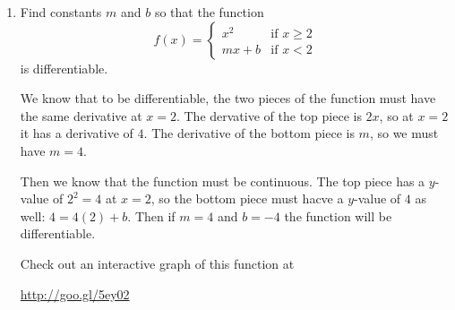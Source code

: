 \documentclass[11pt]{article}
\begin{document}
\begin{enumerate}
\begin{enumerate}
{    }
    \vfill
  \end{enumerate}

\newpage

\item Find constants $m$ and $b$ so that the function
  \[
  f(x) = \begin{cases} x^2 &\mbox{if } x\geq 2\\
    mx+b &\mbox{if } x < 2 \end{cases}
  \]
  is differentiable.
  \vfill
  {\color{blue}
    
    We know that to be differentiable, the two pieces of the function
    must have the same derivative at $x=2$. The dervative of the top
    piece is $2x$, so at $x=2$ it has a derivative of $4$. The
    derivative of the bottom piece is $m$, so we must have $m = 4$.

    Then we know that the function must be continuous.  The top piece
    has a $y$-value of $2^2 = 4$ at $x = 2$, so the bottom piece must
    hacve a $y$-value of $4$ as well: $4 = 4(2) + b$.  Then if $m = 4$
    and $b = -4$ the function will be differentiable.
    
    Check out an interactive graph of this function at
  }
  \begin{center}
    \url{http://goo.gl/5ey02}
  \end{center}

  \vfill
\end{enumerate}
\end{document}
